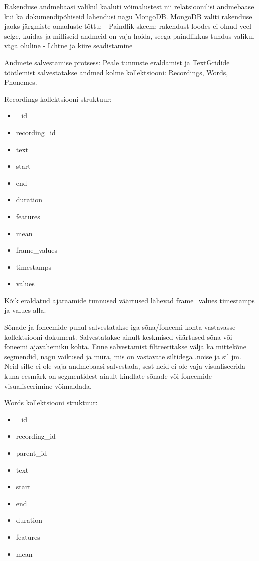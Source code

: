 Rakenduse andmebaasi valikul kaaluti võimalustest nii relatsioonilisi andmebaase kui ka dokumendipõhiseid lahendusi nagu MongoDB.
 MongoDB valiti rakenduse jaoks järgmiste omaduste tõttu:
 - Paindlik skeem: rakendust loodes ei olnud veel selge, kuidas ja milliseid andmeid on vaja hoida, seega paindlikkus tundus valikul väga oluline
 - Lihtne ja kiire seadistamine
 
Andmete salvestamise protsess:
Peale tunnuste eraldamist ja  TextGridide töötlemist salvestatakse andmed kolme kollektsiooni: Recordings, Words, Phonemes.


Recordings kollektsiooni struktuur:
\begin{itemize}
    \item \_id
    \item recording\_id
    \item text
    \item start
    \item end
    \item duration
    \item features
    \item mean
        \item frame\_values
        \item timestamps
        \item values
\end{itemize}

Kõik eraldatud ajaraamide tunnused väärtused lähevad frame\_values timestamps ja values alla.

Sõnade ja foneemide puhul salvestatakse iga sõna/foneemi kohta vastavasse kollektsiooni dokument. Salvestatakse ainult keskmised väärtused sõna või foneemi ajavahemiku kohta. Enne salvestamist filtreeritakse välja ka mittekõne segmendid, nagu vaikused ja müra, mis on vastavate siltidega .noise ja sil jm. Neid silte ei ole  vaja andmebaasi salvestada, sest neid ei ole vaja visualiseerida kuna eesmärk on segmentidest ainult kindlate sõnade või foneemide visualiseerimine võimaldada.

Words kollektsiooni struktuur:
\begin{itemize}
    \item \_id
    \item recording\_id
    \item parent\_id
    \item text
    \item start
    \item end
    \item duration
    \item features
        \item mean
\end{itemize}


